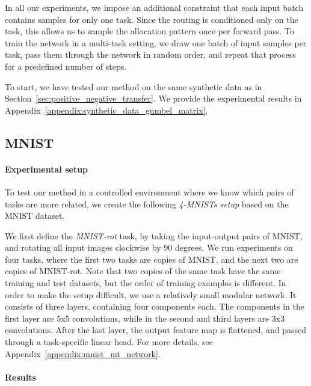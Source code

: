 \documentclass[conference]{IEEEtran}
\begin{document}
In all our experiments, we impose an additional constraint that each input batch contains samples for only one task. Since the routing is conditioned only on the task, this allows us to sample the allocation pattern once per forward pass. To train the network in a multi-task setting, we draw one batch of input samples per task, pass them through the network in random order, and repeat that process for a predefined number of steps.

To start, we have tested our method on the same synthetic data as in Section~\ref{sec:positive_negative_transfer}. We provide the experimental results in Appendix~\ref{appendix:synthetic_data_gumbel_matrix}.

\subsection{MNIST}

\paragraph{Experimental setup}
To test our method in a controlled environment where we know which pairs of tasks are more related, we create the following \textit{4-MNISTs setup} based on the MNIST dataset.

We first define the \textit{MNIST-rot} task, by taking the input-output pairs of MNIST, and rotating all input images clockwise by $90$ degrees.
We run experiments on four tasks, where the first two tasks are copies of MNIST, and the next two are copies of MNIST-rot. Note that two copies of the same task have the same training and test datasets, but the order of training examples is different.
In order to make the setup difficult, we use a relatively small modular network. It consists of three layers, containing four components each. The components in the first  layer are 5x5 convolutions, while in the second and third layers are 3x3 convolutions. After the last layer, the output feature map is flattened, and passed through a task-specific linear head.
For more details, see Appendix~\ref{appendix:mnist_mt_network}.

\paragraph{Results}
\end{document}
